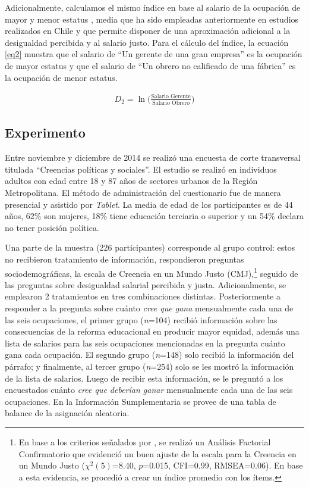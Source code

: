\documentclass[12pt]{article}
\begin{document}
Adicionalmente, calculamos el mismo índice en base al salario de la ocupación de mayor y menor estatus \citep{Jasso1999}, media que ha sido empleadas anteriormente en estudios realizados en Chile \citep{Castillo2012justice,Castillo2012} y que permite disponer de una aproximación adicional a la desigualdad percibida y al salario justo. Para el cálculo del índice, la ecuación \ref{eq2} muestra que el salario de ``Un gerente de una gran empresa'' es la ocupación de mayor estatus y que el salario de ``Un obrero no calificado de una fábrica'' es la ocupación de menor estatus.


\begin{equation}
\begin{aligned}
\label{eq2}
D_2  = \ln\Bigg(\frac{\text{Salario Gerente}}{\text{Salario Obrero}}\Bigg)
\end{aligned}
\end{equation}
	
\subsection*{Experimento}\label{experimento}

Entre noviembre y diciembre de 2014 se realizó una encuesta de corte transversal titulada ``Creencias políticas y sociales''. El estudio se realizó en individuos adultos con edad entre 18 y 87 años de sectores urbanos de la Región Metropolitana. El método de administración del cuestionario fue de manera presencial y asistido por \emph{Tablet}. La media de edad de los participantes es de 44 años, 62\% son mujeres, 18\% tiene educación terciaria o superior y un 54\% declara no tener posición política.

Una parte de la muestra (226 participantes) corresponde al grupo control: estos no recibieron tratamiento de información, respondieron preguntas sociodemográficas, la escala de Creencia en un Mundo Justo (CMJ),\footnote{En base a los criterios señalados por \cite{Brown2008}, se realizó un Análisis Factorial Confirmatorio que evidenció un buen ajuste de la escala para la Creencia en un Mundo Justo (\(\chi^2(5)\)=8.40, \(p\)=0.015, CFI=0.99, RMSEA=0.06). En base a esta evidencia, se procedió a crear un índice promedio con los ítems.} seguido de las preguntas sobre desigualdad salarial percibida y justa. Adicionalmente, se emplearon 2 tratamientos en tres combinaciones distintas. Posteriormente a responder a la pregunta sobre cuánto \emph{cree que gana} mensualmente cada una de las seis ocupaciones, el primer grupo (\emph{n}=104) recibió información sobre las consecuencias de la reforma educacional en producir mayor equidad, además una lista de salarios para las seis ocupaciones mencionadas en la pregunta cuánto gana cada ocupación. El segundo grupo (\emph{n}=148) solo recibió la información del párrafo; y finalmente, al tercer grupo (\emph{n}=254) solo se les mostró la información de la lista de salarios. Luego de recibir esta información, se le preguntó a los encuestados cuánto \emph{cree que deberían ganar} mensualmente cada una de las seis ocupaciones. En la Información Sumplementaria se provee de una tabla de balance de la asignación aleatoria.
\end{document}
